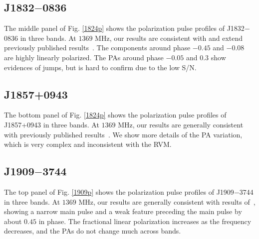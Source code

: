 \documentclass[useAMS,usenatbib]{mn2e}
\begin{document}
\subsection{J1832$-$0836}

The middle panel of Fig. \ref{1824p} shows the polarization pulse profiles of 
J1832$-$0836 
in three bands.
%
At $1369$ MHz, our results are consistent with and extend previously published 
results~\citep{Burgay13}.
%
The components around phase $-0.45$ and $-0.08$ are highly linearly polarized. 
%
The PAs around phase $-0.05$ and $0.3$ show evidences of jumps, but is hard 
to confirm due to the low S/N.


\subsection{J1857+0943}

The bottom panel of Fig. \ref{1824p} shows the polarization pulse profiles of 
J1857+0943 
in three bands.
%
At $1369$ MHz, our results are generally consistent with previously published 
results~\citep{Yan11}.
%
We show more details of the PA variation, which is very complex and inconsistent 
with the RVM.
%


\subsection{J1909$-$3744}

The top panel of Fig. \ref{1909p} shows the polarization pulse profiles of 
J1909$-$3744 
in three bands.
%
At $1369$ MHz, our results are generally consistent with results of~\citet{Ord04,Yan11}, 
showing a narrow main pulse and a weak feature preceding the main pulse by about $0.45$ 
in phase.
%
The fractional linear polarization increases as the frequency decreases, and the
PAs do not change much across bands.

\end{document}
